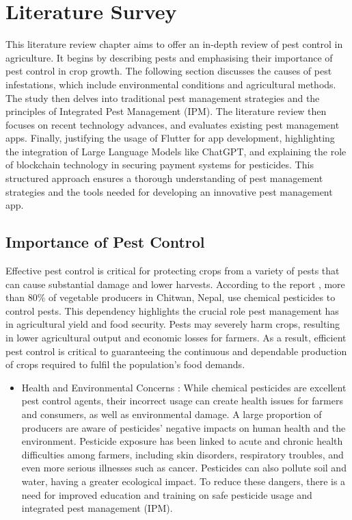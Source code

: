 \chapter{Literature Survey}
This literature review chapter aims to offer an in-depth review of pest control in agriculture. It begins by describing pests and emphasising their importance of pest control in crop growth. The following section discusses the causes of pest infestations, which include environmental conditions and agricultural methods. The study then delves into traditional pest management strategies and the principles of Integrated Pest Management (IPM).
The literature review then focuses on recent technology advances, and evaluates existing pest management apps. Finally, justifying the usage of Flutter for app development, highlighting the integration of Large Language Models like ChatGPT, and explaining the role of blockchain technology in securing payment systems for pesticides. This structured approach ensures a thorough understanding of pest management strategies and the tools needed for developing an innovative pest management app.

\section{Importance of Pest Control}
Effective pest control is critical for protecting crops from a variety of pests that can cause substantial damage and lower harvests. According to the report \cite{rijal_2018_farmers}, more than 80\% of vegetable producers in Chitwan, Nepal, use chemical pesticides to control pests. This dependency highlights the crucial role pest management has in agricultural yield and food security. Pests may severely harm crops, resulting in lower agricultural output and economic losses for farmers. As a result, efficient pest control is critical to guaranteeing the continuous and dependable production of crops required to fulfil the population's food demands.
\begin{itemize}
    \item Health and Environmental Concerns : While chemical pesticides are excellent pest control agents, their incorrect usage can create health issues for farmers and consumers, as well as environmental damage. A large proportion of producers are aware of pesticides' negative impacts on human health and the environment. Pesticide exposure has been linked to acute and chronic health difficulties among farmers, including skin disorders, respiratory troubles, and even more serious illnesses such as cancer. Pesticides can also pollute soil and water, having a greater ecological impact. To reduce these dangers, there is a need for improved education and training on safe pesticide usage and integrated pest management (IPM).
\end{itemize}

